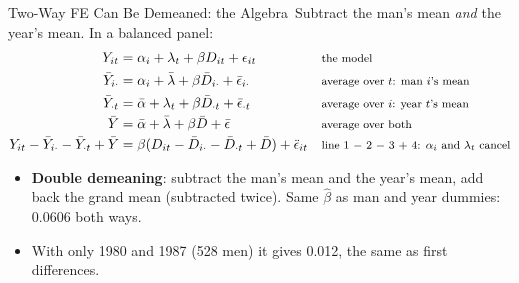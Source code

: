 \documentclass[aspectratio=169,11pt,xcolor=dvipsnames]{beamer}
\newcommand{\adv}{\,\raisebox{0.6pt}{\textcolor{accent}{$\bigstar$}}}
\begin{document}
\begin{frame}{Two-Way FE Can Be Demeaned: the Algebra\adv}
Subtract the man's mean \emph{and} the year's mean. In a balanced panel:
\begin{align*}
  Y_{it} &= \alpha_i + \lambda_t + \beta D_{it} + \epsilon_{it}
   && \text{\footnotesize the model} \\
  \bar Y_{i\cdot} &= \alpha_i + \bar\lambda + \beta\bar D_{i\cdot} + \bar\epsilon_{i\cdot}
   && \text{\footnotesize average over $t$: man $i$'s mean} \\
  \bar Y_{\cdot t} &= \bar\alpha + \lambda_t + \beta\bar D_{\cdot t} + \bar\epsilon_{\cdot t}
   && \text{\footnotesize average over $i$: year $t$'s mean} \\
  \bar Y &= \bar\alpha + \bar\lambda + \beta\bar D + \bar\epsilon
   && \text{\footnotesize average over both} \\
  Y_{it} - \bar Y_{i\cdot} - \bar Y_{\cdot t} + \bar Y
  &= \beta(D_{it} - \bar D_{i\cdot} - \bar D_{\cdot t} + \bar D) + \ddot\epsilon_{it}
   && \text{\footnotesize line 1 $-$ 2 $-$ 3 $+$ 4: $\alpha_i$ and $\lambda_t$ cancel}
\end{align*}
\vskip-2pt
\begin{itemize}\itemsep2pt
  \item \textbf{Double demeaning}: subtract the man's mean and the year's mean, add back
        the grand mean (subtracted twice). Same $\hat\beta$ as man and year dummies:
        0.0606 both ways.
  \item With only 1980 and 1987 (528 men) it gives 0.012, the same as first differences.
\end{itemize}
\end{frame}
\end{document}
